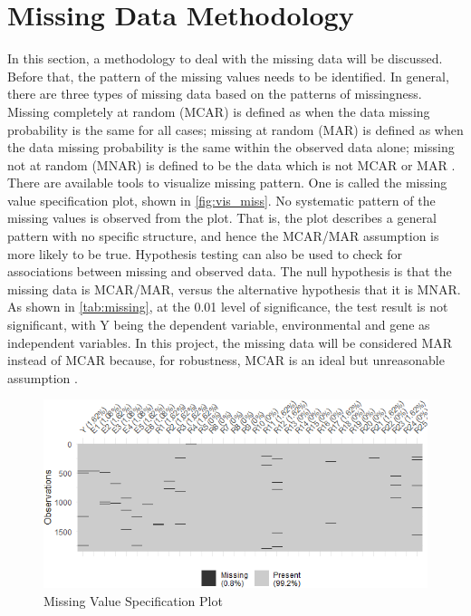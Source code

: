 \documentclass[11pt]{article}
\begin{document}


\section{Missing Data Methodology}
In this section, a methodology to deal with the missing data will be discussed. Before that, the pattern of the missing values needs to be identified. In general, there are three types of missing data based on the patterns of missingness. Missing completely at random (MCAR) is defined as when the data missing probability is the same for all cases; missing at random (MAR) is defined as when the data missing probability is the same within the observed data alone; missing not at random (MNAR) is defined to be the data which is not MCAR or MAR \cite{bk:buuren, bk:rao}. There are available tools to visualize missing pattern. One is called the missing value specification plot, shown in \autoref{fig:vis_miss}. No systematic pattern of the missing values is observed from the plot. That is, the plot describes a general pattern with no specific structure, and hence the MCAR/MAR assumption is more likely to be true. Hypothesis testing can also be used to check for associations between missing and observed data. The null hypothesis is that the missing data is MCAR/MAR, versus the alternative hypothesis that it is MNAR. As shown in \autoref{tab:missing}, at the 0.01 level of significance, the test result is not significant, with Y being the dependent variable, environmental and gene as independent variables. In this project, the missing data will be considered MAR instead of MCAR because, for robustness, MCAR is an ideal but unreasonable assumption \cite{ar:kang}.

\begin{figure}[h!]
\begin{center}
\includegraphics[scale=0.69]{vis_miss}
\end{center}
\caption{Missing Value Specification Plot}
\label{fig:vis_miss}
\end{figure}
\end{document}

